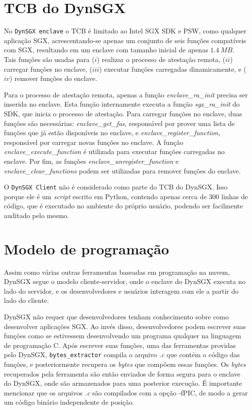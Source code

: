 \section{TCB do DynSGX}
\label{sec:dynsgx_tcb}

No \texttt{DynSGX enclave} o TCB é limitado ao Intel SGX SDK e PSW, como
qualquer aplicação SGX, acrescentando-se apenas um conjunto de seis funções
compatíveis com SGX, resultando em um enclave com tamanho inicial de apenas
$1.4\ MB$. Tais funções são usadas para ($i$) realizar o processo de atestação
remota, ($ii$) carregar funções no enclave, ($iii$) executar funções carregadas
dinamicamente, e ($iv$) remover funções do enclave.

Para o processo de atestação remota, apenas a função \textit{enclave\_ra\_init}
precisa ser inserida no enclave. Esta função internamente executa a função
\textit{sgx\_ra\_init} do SDK, que inicia o processo de atestação. Para
carregar funções no enclave, duas funções são necessárias: \textit
{enclave\_get\_fas}, responsável por prover uma lista de funções que já estão
disponíveis no enclave, e \textit{enclave\_register\_function}, responsável por
carregar novas funções no enclave. A função \textit{enclave\_execute\_function}
é utilizada para executar funções carregadas no enclave. Por fim, as funções
\textit{enclave\_unregister\_function} e \textit{enclave\_clear\_functions}
podem ser utilizadas para remover funções do enclave.

O \texttt{DynSGX Client} não é considerado como parte do TCB do DynSGX. Isso
porque ele é um \textit{script} escrito em Python, contendo apenas cerca de $300$
linhas de código, que é executado no ambiente do próprio usuário, podendo ser
facilmente auditado pelo mesmo.

\section{Modelo de programação}
\label{sec:dynsgx_modelo_programacao}

Assim como várias outras ferramentas baseadas em programação na nuvem, DynSGX
segue o modelo cliente-servidor, onde o enclave do DynSGX executa no lado do
servidor, e os desenvolvedores e usuários interagem com ele a partir do lado do
cliente.

DynSGX não requer que desenvolvedores tenham conhecimento sobre como desenvolver
aplicações SGX. Ao invés disso, desenvolvedores podem escrever suas funções como
se estivessem desenvolvendo um programa qualquer na linguagem de programação C.
Após escrever suas funções, uma das ferramentas providas pelo DynSGX, \texttt
{bytes\_extractor} compila o arquivo \textit{.c} que contém o código das
funções, e posteriormente recupera os \textit{bytes} que compõem essas funções.
Os \textit{bytes} recuperados pela ferramenta são então enviados de forma segura
para o enclave do DynSGX, onde são armazenados para uma posterior execução. É
importante mencionar que os arquivos \textit{.c} são compilados com a opção
-fPIC, de modo a gerar um código binário independente de posição.

